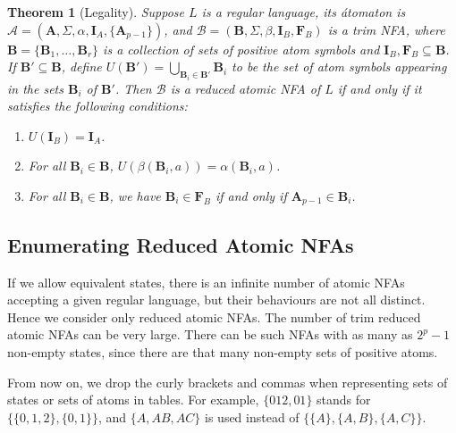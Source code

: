 \documentclass[preprint,12pt]{elsarticle}
\newcommand{\Sig}{\Sigma}
\newcommand{\be}{\begin{enumerate}}
\newcommand{\ee}{\end{enumerate}}
\newcommand{\cA}{{\mathcal A}}
\newcommand{\cB}{{\mathcal B}}
\newtheorem{theorem}{Theorem}
\begin{document}
\begin{theorem}[Legality]
\label{thm:unions}
Suppose $L$ is a regular language,  its \'atomaton is
$\cA=({\mathbf A},\Sig,\alpha, {\mathbf I}_A,\{{\mathbf A}_{p-1}\})$, and
$\cB=({\mathbf B},\Sig,\beta,{\mathbf I}_B,{\mathbf F}_B)$ is a trim NFA, where 
${\mathbf B}=\{{\mathbf B}_1,\ldots,{\mathbf B}_r\}$ is a collection of 
sets of positive atom symbols and ${\mathbf I}_B,{\mathbf F}_B\subseteq{\mathbf B}$.
If ${\mathbf B}'\subseteq{\mathbf B}$, define 
$U({\mathbf B}')=\bigcup_{{\mathbf B}_i\in {\mathbf B}'} {\mathbf B}_i$ to be the set of atom symbols 
appearing in the sets ${\mathbf B}_i$  of ${\mathbf B}'$. 
Then $\cB$ is a reduced atomic NFA of $L$ if and only if it satisfies the following
conditions:
\be
\item
\label{cond:in}
$U({\mathbf I}_B)={\mathbf I}_A$.
\item
\label{cond:trans}
For all ${\mathbf B}_i\in {\mathbf B}$, $U(\beta({\mathbf B}_i,a))=\alpha({\mathbf B}_i,a)$.
\item
\label{cond:out}
For all ${\mathbf B}_i\in {\mathbf B}$, we have ${\mathbf B}_i\in {\mathbf F}_B$ 
if and only if ${\mathbf A}_{p-1}\in {\mathbf B}_i$.
\ee
\end{theorem}


\subsection{Enumerating Reduced Atomic NFAs}
If we allow equivalent states, there is an infinite number of atomic NFAs 
accepting a given regular language, but their behaviours are not all distinct.
Hence we consider only reduced atomic NFAs.
The number of trim reduced atomic NFAs can be very large. 
There can be such NFAs with as many as $2^p-1$ non-empty states, 
since there are that many non-empty sets of positive atoms. 

From now on, we drop the curly brackets and commas when representing 
sets of states or sets of atoms in tables.
For example, $\{012,01\}$ stands for $\{ \{0,1,2\},\{0,1\} \}$, and 
$\{A,AB,AC\}$ is used instead of $\{ \{A\}, \{A,B\},\{A,C\} \}$.
\end{document}
